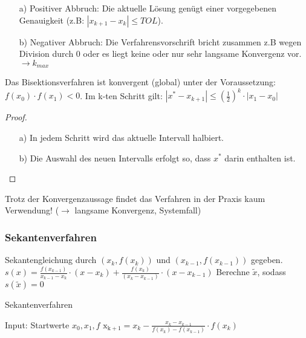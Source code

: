 \begin{enumerate}
\item[a)] Positiver Abbruch: Die aktuelle Lösung genügt einer vorgegebenen Genauigkeit
      (z.B: $|x_{k+1}-x_k|\leq TOL$).
\item[b)] Negativer Abbruch: Die Verfahrensvorschrift bricht zusammen z.B wegen Division durch 0
      oder es liegt keine oder nur sehr langsame Konvergenz vor. $\rightarrow k_{max}$
\end{enumerate}

\begin{lemma}
Das Bisektionsverfahren ist konvergent (global) unter der Voraussetzung:
$f(x_0) \cdot f(x_1) <0$. Im k-ten Schritt gilt: $|x^*-x_{k+1}|\leq
(\frac{1}{2})^k \cdot |x_1-x_0|$ 
\end{lemma}

\begin{proof}
~
\begin{enumerate}
\item[a)] In jedem Schritt wird das aktuelle Intervall halbiert. 
\item[b)] Die Auswahl des neuen Intervalls erfolgt so, dass $x^*$ darin enthalten ist.
\end{enumerate}
\end{proof}

Trotz der Konvergenzaussage findet das Verfahren in der Praxis kaum Verwendung!
($\rightarrow$ langsame Konvergenz, Systemfall)

\subsubsection{Sekantenverfahren}

Sekantengleichung durch $(x_k, f(x_k))$ und $(x_{k-1}, f(x_{k-1}))$ gegeben.
\newline
$s(x)=\frac{f(x_{k-1})}{x_{k-1}-x_k} \cdot (x-x_k)+\frac{f(x_k)}{(x_k-x_{k-1})}\cdot (x-x_{k-1})$
\newline
Berechne $\tilde x$, sodass $s(\tilde x)=0$

\begin{algorithm}
\caption{Sekantenverfahren}
\begin{algorithmic}
\STATE Input: Startwerte $x_0, x_1, f$
  \STATE $\mathrm{x_{k+1}}= x_k - \frac{x_k-x_{k-1}}{f(x_k)-f(x_{k-1})} \cdot f(x_k)$
\ENDFOR
\end{algorithmic}
\end{algorithm}

